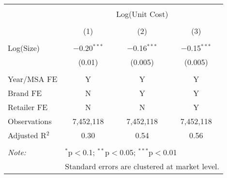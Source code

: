 
\begin{table}[!htbp] \centering 
  \caption{} 
  \label{tab:bulkDiscountUnitCost4100} 
\begin{tabular}{@{\extracolsep{5pt}}lccc} 
\\[-1.8ex]\hline 
\hline \\[-1.8ex] 
 & \multicolumn{3}{c}{Log(Unit Cost)} \\ 
\cline{2-4} 
\\[-1.8ex] & (1) & (2) & (3)\\ 
\hline \\[-1.8ex] 
 Log(Size) & $-$0.20$^{***}$ & $-$0.16$^{***}$ & $-$0.15$^{***}$ \\ 
  & (0.01) & (0.005) & (0.005) \\ 
 \hline \\[-1.8ex] 
Year/MSA FE & Y & Y & Y \\ 
Brand FE & N & Y & Y \\ 
Retailer FE & N & N & Y \\ 
Observations & 7,452,118 & 7,452,118 & 7,452,118 \\ 
Adjusted R$^{2}$ & 0.30 & 0.54 & 0.56 \\ 
\hline 
\hline \\[-1.8ex] 
\textit{Note:}  & \multicolumn{3}{l}{$^{*}$p$<$0.1; $^{**}$p$<$0.05; $^{***}$p$<$0.01} \\ 
 & \multicolumn{3}{l}{Standard errors are clustered at market level.} \\ 
\end{tabular} 
\end{table} 
